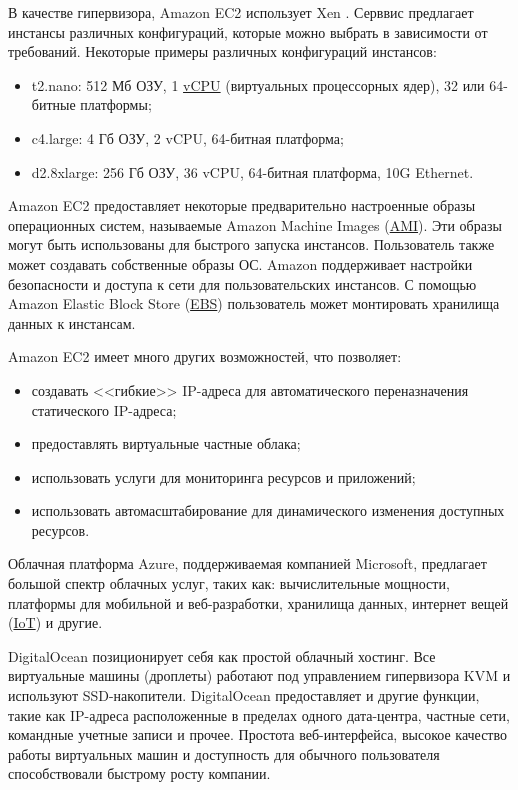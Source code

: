 
В качестве гипервизора, Amazon EC2 использует Xen \cite{xen}.
Серввис предлагает инстансы различных конфигураций, которые можно выбрать в зависимости от требований.
Некоторые примеры различных конфигураций инстансов:
\begin{itemize}
  \item t2.nano: 512 Мб ОЗУ, 1 \hyperlink{vcpu}{vCPU} (виртуальных процессорных ядер), 32 или 64-битные платформы;
  \item c4.large: 4 Гб ОЗУ, 2 vCPU, 64-битная платформа;
  \item d2.8xlarge: 256 Гб ОЗУ, 36 vCPU, 64-битная платформа, 10G Ethernet.
\end{itemize}

Amazon EC2 предоставляет некоторые предварительно настроенные образы операционных систем, называемые Amazon Machine Images (\hyperlink{ami}{AMI}).
Эти образы могут быть использованы для быстрого запуска инстансов.
Пользователь также может создавать собственные образы ОС.
Amazon поддерживает настройки безопасности и доступа к сети для пользовательских инстансов.
С помощью Amazon Elastic Block Store (\hyperlink{ebs}{EBS}) пользователь может монтировать хранилища данных к инстансам.

Amazon EC2 имеет много других возможностей, что позволяет:
\begin{itemize}
  \item создавать <<гибкие>> IP-адреса для автоматического переназначения статического IP-адреса;
  \item предоставлять виртуальные частные облака;
  \item использовать услуги для мониторинга ресурсов и приложений;
  \item использовать автомасштабирование для динамического изменения доступных ресурсов.
\end{itemize}

Облачная платформа Azure, поддерживаемая компанией Microsoft, предлагает большой спектр облачных услуг, таких как: вычислительные мощности, платформы для мобильной и веб-разработки, хранилища данных, интернет вещей (\hyperlink{iot}{IoT}) и другие.

DigitalOcean позиционирует себя как простой облачный хостинг.
Все виртуальные машины (дроплеты) работают под управлением гипервизора KVM и используют SSD-накопители.
DigitalOcean предоставляет и другие функции, такие как IP-адреса расположенные в пределах одного дата-центра, частные сети, командные учетные записи и прочее.
Простота веб-интерфейса, высокое качество работы виртуальных машин и доступность для обычного пользователя способствовали быстрому росту компании.

